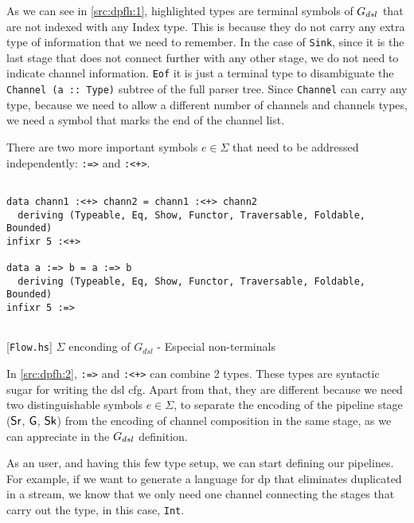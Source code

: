 As we can see in \autoref{src:dpfh:1}, highlighted types are terminal symbols of $G_{dsl}$ that are not indexed with any Index type. 
This is because they do not carry any extra type of information that we need to remember. In the case of \texttt{Sink}, since it is the last stage that does not connect further with any other stage, we do not need to indicate channel information. 
\texttt{Eof} it is just a terminal type to disambiguate the \texttt{Channel (a :: Type)} subtree of the full parser tree. Since \texttt{Channel} can carry any type, 
because we need to allow a different number of channels and channels types, we need a symbol that marks the end of the channel list.

There are two more important symbols $e \in \Sigma$ that need to be addressed independently: \texttt{:=>} and \texttt{:<+>}.

\begin{listing}[H]
  \begin{verbatim}

data chann1 :<+> chann2 = chann1 :<+> chann2
  deriving (Typeable, Eq, Show, Functor, Traversable, Foldable, Bounded)
infixr 5 :<+>
   
data a :=> b = a :=> b
  deriving (Typeable, Eq, Show, Functor, Traversable, Foldable, Bounded)
infixr 5 :=>
   
  \end{verbatim}
  \caption{[\texttt{Flow.hs}] $\Sigma$ enconding of $G_{dsl}$ - Especial non-terminals}
  \label{src:dpfh:2}
\end{listing}

In \autoref{src:dpfh:2}, \texttt{:=>} and \texttt{:<+>} can combine 2 types. 
These types are syntactic sugar for writing the \acrshort{dsl} \acrshort{cfg}. 
Apart from that, they are different because we need two distinguishable symbols $e \in \Sigma$, to separate the encoding of the pipeline stage ($\mathsf{Sr}$, $\mathsf{G}$, $\mathsf{Sk}$)
from the encoding of channel composition in the same stage, as we can appreciate in the $G_{dsl}$ definition.

As an user, and having this few type setup, we can start defining our pipelines.  
For example, if we want to generate a language for \acrshort{dp} that eliminates duplicated in a stream, we know that we only need one channel connecting the stages that carry out the type, in this case, \texttt{Int}.

